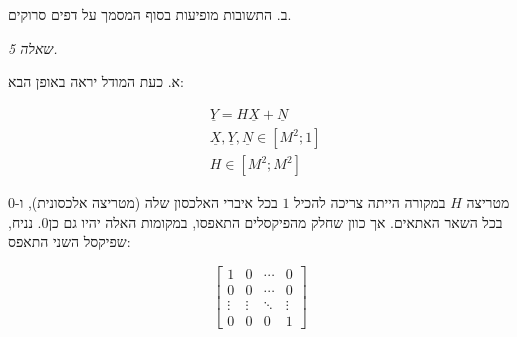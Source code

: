 \documentclass[a4paper]{iacas}
\begin{document}
\begin{hebrew}
ב. התשובות מופיעות בסוף המסמך על דפים סרוקים.
\end{hebrew}



\newpage

\begin{hebrew}
\textit{\huge שאלה 5.}

א. כעת המודל יראה באופן הבא:
\end{hebrew}

\begin{equation*}
\begin{aligned}
&\underline{Y} = H\underline{X} + \underline{N} \\ 
&\underline{X} , \underline{Y}, \underline{N}  \in [M^2 ; 1] \\
&H \in [M^2 ; M^2]
\end{aligned}
\end{equation*}

\begin{hebrew}
מטריצה $H$ במקורה הייתה צריכה להכיל $1$ בכל איברי האלכסון שלה (מטריצה אלכסונית), ו-$0$ בכל השאר האתאים. אך כוון שחלק מהפיקסלים התאפסו, במקומות האלה יהיו  גם כן$0$. נניח, שפיקסל השני התאפס:
\end{hebrew}
\newline
\begin{equation*}
\begin{bmatrix}
1 & 0 & \cdots & 0\\
0 & 0 & \cdots & 0\\
\vdots & \vdots & \ddots & \vdots \\
0 & 0 & 0 & 1
\end{bmatrix}
\end{equation*}
\newline
\end{document}
